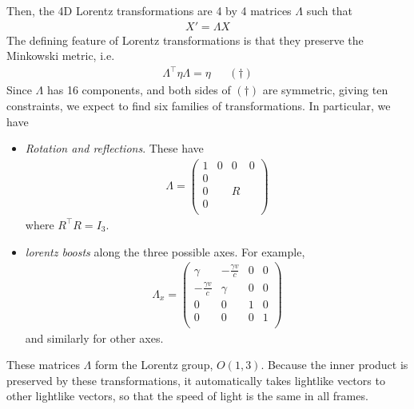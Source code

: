 \documentclass{../template/note}
\begin{document}
    Then, the 4D Lorentz transformations are 4 by 4 matrices \(\Lambda\) such that
    \begin{align*}
        X' = \Lambda X
    \end{align*}
    The defining feature of Lorentz transformations is that they preserve the Minkowski metric, i.e.
    \begin{align*}
        \Lambda^\intercal \eta \Lambda = \eta && (\dagger)
    \end{align*}
    Since \(\Lambda\) has 16 components, and both sides of \((\dagger)\) are symmetric, giving ten constraints, we expect to find six families of transformations. In particular, we have
    \begin{itemize}
        \item \emph{Rotation and reflections}. These have
        \begin{align*}
            \Lambda = \begin{pmatrix}
             1 & 0 & 0 & 0 \\
             0 &  &  &  \\
             0 &  & R &  \\
             0 &  &  &  \\
            \end{pmatrix}
        \end{align*}
        where \(R^\intercal R = I_3\).
        \item \emph{lorentz boosts} along the three possible axes. For example,
        \begin{align*}
            \Lambda_x = \begin{pmatrix}
             \gamma & -\frac{\gamma v}c & 0 & 0 \\
             -\frac{\gamma v}c & \gamma & 0 & 0 \\
             0 & 0 & 1 & 0 \\
             0 & 0 & 0 & 1 \\
            \end{pmatrix}
        \end{align*}
        and similarly for other axes.
    \end{itemize}
    These matrices \(\Lambda\) form the Lorentz group, \(O(1, 3)\). Because the inner product is preserved by these transformations, it automatically takes lightlike vectors to other lightlike vectors, so that the speed of light is the same in all frames.
\end{document}
